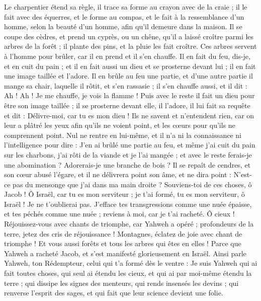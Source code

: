 \begin{multicols}{2}
Le charpentier étend sa règle, il trace sa forme au crayon avec de la craie ; il le fait avec des équerres, et le forme au compas, et le fait à la ressemblance d'un homme, selon la beauté d'un homme, afin qu'il demeure dans la maison.
Il se coupe des cèdres, et prend un cyprès, ou un chêne, qu'il a laissé croître parmi les arbres de la forêt ; il plante des pins, et la pluie les fait croître.
Ces arbres servent à l'homme pour brûler, car il en prend et il s'en chauffe. Il en fait du feu, dis-je, et en cuit du pain ; et il en fait aussi un dieu et se prosterne devant lui ; il en fait une image taillée et l'adore.
Il en brûle au feu une partie, et d'une autre partie il mange sa chair, laquelle il rôtit, et s'en rassasie ; il s'en chauffe aussi, et il dit : Ah ! Ah ! Je me chauffe, je vois la flamme !
Puis avec le reste il fait un dieu pour être son image taillée ; il se prosterne devant elle, il l'adore, il lui fait sa requête et dit : Délivre-moi, car tu es mon dieu !
Ils ne savent et n'entendent rien, car on leur a plâtré les yeux afin qu'ils ne voient point, et les cœurs pour qu'ils ne comprennent point.
Nul ne rentre en lui-même, et il n'a ni la connaissance ni l'intelligence pour dire : J'en ai brûlé une partie au feu, et même j'ai cuit du pain sur les charbons, j'ai rôti de la viande et je l'ai mangée ; et avec le reste ferais-je une abomination ? Adorerais-je une branche de bois ?
Il se repaît de cendres, et son cœur abusé l'égare, et il ne délivrera point son âme, et ne dira point : N'est-ce pas du mensonge que j'ai dans ma main droite ?
Souviens-toi de ces choses, ô Jacob ! Ô Israël, car tu es mon serviteur ; je t'ai formé, tu es mon serviteur, ô Israël ! Je ne t'oublierai pas.
J'efface tes transgressions comme une nuée épaisse, et tes péchés comme une nuée ; reviens à moi, car je t'ai racheté.
Ô cieux ! Réjouissez-vous avec chants de triomphe, car Yahweh a opéré ; profondeurs de la terre, jetez des cris de réjouissance ! Montagnes, éclatez de joie avec chant de triomphe ! Et vous aussi forêts et tous les arbres qui êtes en elles ! Parce que Yahweh a racheté Jacob, et s'est manifesté glorieusement en Israël.
Ainsi parle Yahweh, ton Rédempteur, celui qui t'a formé dès le ventre : Je suis Yahweh qui ai fait toutes choses, qui seul ai étendu les cieux, et qui ai par moi-même étendu la terre ;
qui dissipe les signes des menteurs, qui rends insensés les devins ; qui renverse l'esprit des sages, et qui fait que leur science devient une folie.

\end{multicols}
